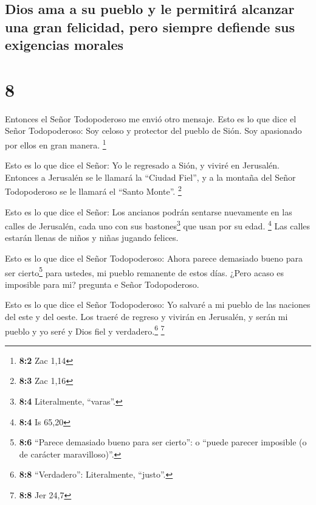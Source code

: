 \hypertarget{dios-ama-a-su-pueblo-y-le-permitiruxe1-alcanzar-una-gran-felicidad-pero-siempre-defiende-sus-exigencias-morales}{%
\subsection{Dios ama a su pueblo y le permitirá alcanzar una gran
felicidad, pero siempre defiende sus exigencias
morales}\label{dios-ama-a-su-pueblo-y-le-permitiruxe1-alcanzar-una-gran-felicidad-pero-siempre-defiende-sus-exigencias-morales}}

\hypertarget{section-7}{%
\section{8}\label{section-7}}

 Entonces el Señor Todopoderoso me envió otro mensaje.
 Esto es lo que dice el Señor Todopoderoso: Soy celoso y
protector del pueblo de Sión. Soy apasionado por ellos en gran manera.
\footnote{\textbf{8:2} Zac 1,14}

 Esto es lo que dice el Señor: Yo le regresado a Sión, y
viviré en Jerusalén. Entonces a Jerusalén se le llamará la ``Ciudad
Fiel'', y a la montaña del Señor Todopoderoso se le llamará el ``Santo
Monte''. \footnote{\textbf{8:3} Zac 1,16}

 Esto es lo que dice el Señor: Los ancianos podrán
sentarse nuevamente en las calles de Jerusalén, cada uno con sus
bastones\footnote{\textbf{8:4} Literalmente, ``varas''.} que usan por su
edad. \footnote{\textbf{8:4} Is 65,20}  Las calles estarán
llenas de niños y niñas jugando felices.

 Esto es lo que dice el Señor Todopoderoso: Ahora parece
demasiado bueno para ser cierto\footnote{\textbf{8:6} ``Parece demasiado
  bueno para ser cierto'': o ``puede parecer imposible (o de carácter
  maravilloso)''.} para ustedes, mi pueblo remanente de estos días.
¿Pero acaso es imposible para mi? pregunta e Señor Todopoderoso.

 Esto es lo que dice el Señor Todopoderoso: Yo salvaré a
mi pueblo de las naciones del este y del oeste.  Los
traeré de regreso y vivirán en Jerusalén, y serán mi pueblo y yo seré y
Dios fiel y verdadero.\footnote{\textbf{8:8} ``Verdadero'':
  Literalmente, ``justo''.} \footnote{\textbf{8:8} Jer 24,7}

